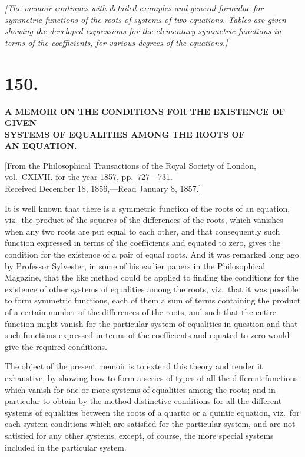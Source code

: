 \documentclass[11pt,a4paper]{article}
\begin{document}
\textit{[The memoir continues with detailed examples and general formulae for
symmetric functions of the roots of systems of two equations. Tables are given
showing the developed expressions for the elementary symmetric functions in
terms of the coefficients, for various degrees of the equations.]}

\newpage
\section*{150.}
\begin{center}
\Large\bfseries
A MEMOIR ON THE CONDITIONS FOR THE EXISTENCE OF GIVEN\\SYSTEMS OF EQUALITIES AMONG THE ROOTS OF\\AN EQUATION.
\end{center}

\begin{flushright}
\small
[From the Philosophical Transactions of the Royal Society of London,\\
vol.~CXLVII. for the year 1857, pp.~727---731.\\
Received December 18, 1856,---Read January 8, 1857.]
\end{flushright}

\normalsize

It is well known that there is a symmetric function of the roots of an
equation, viz.\ the product of the squares of the differences of the roots,
which vanishes when any two roots are put equal to each other, and that
consequently such function expressed in terms of the coefficients and equated
to zero, gives the condition for the existence of a pair of equal roots. And
it was remarked long ago by Professor Sylvester, in some of his earlier papers
in the Philosophical Magazine, that the like method could be applied to
finding the conditions for the existence of other systems of equalities among
the roots, viz.\ that it was possible to form symmetric functions, each of
them a sum of terms containing the product of a certain number of the
differences of the roots, and such that the entire function might vanish for
the particular system of equalities in question and that such functions
expressed in terms of the coefficients and equated to zero would give the
required conditions.

The object of the present memoir is to extend this theory and render it
exhaustive, by showing how to form a series of types of all the different
functions which vanish for one or more systems of equalities among the roots;
and in particular to obtain by the method distinctive conditions for all the
different systems of equalities between the roots of a quartic or a quintic
equation, viz.\ for each system conditions which are satisfied for the
particular system, and are not satisfied for any other systems, except, of
course, the more special systems included in the particular system.
\end{document}
